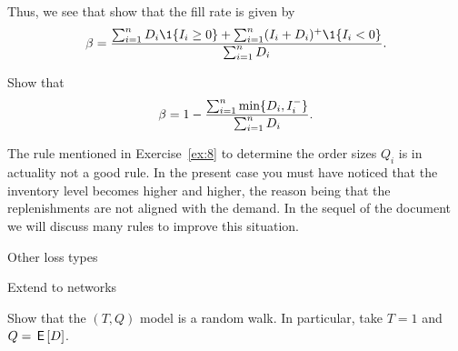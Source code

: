 Thus, we see that show that the fill rate is given by
\begin{equation}
\beta =   \frac{\sum_{i=1}^n D_i\1{I_i\geq 0} + \sum_{i=1}^n (I_i+D_i)^+\1{I_i< 0}}{\sum_{i=1}^n D_i}.
\end{equation}

\begin{exercise}
  Show that 
  \begin{equation*}
    \beta = 1 - \frac{\sum_{i=1}^n \min\{D_i, I_i^-\}}{\sum_{i=1}^n D_i}.
  \end{equation*}
\end{exercise}

The rule mentioned in Exercise~\ref{ex:8} to determine the order sizes $Q_i$ is in actuality not a good rule. In the present case you must have noticed that the inventory level becomes higher and higher, the reason being that the replenishments are not aligned with the demand. In the sequel of the document we will discuss many rules to improve this situation.

\begin{exercise}
  Other loss types
\end{exercise}

\begin{exercise}
  Extend to networks
\end{exercise}

\begin{exercise}
  Show that the $(T,Q)$ model is a random walk. In particular, take $T=1$ and $Q = \,\mathsf{E}\left[D\right]$. 
\end{exercise}

\clearpage

